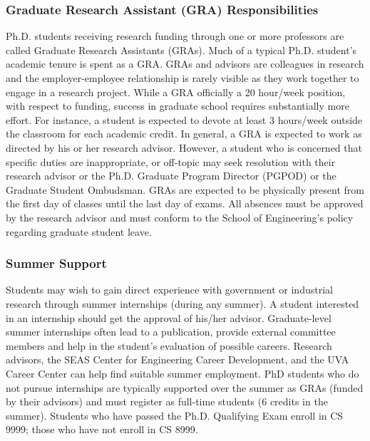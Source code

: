 \hypertarget{graduate-research-assistant-gra-responsibilities}{
\subsubsection{Graduate Research Assistant (GRA) Responsibilities}
\label{graduate-research-assistant-gra-responsibilities}
}

Ph.D. students receiving research funding through one or more professors
are called Graduate Research Assistants (GRAs). Much of a typical Ph.D.
student's academic tenure is spent as a GRA. GRAs and advisors are
colleagues in research and the employer-employee relationship is rarely
visible as they work together to engage in a research project. While a
GRA officially a 20 hour/week position, with respect to funding, success
in graduate school requires substantially more effort. For instance, a
student is expected to devote at least 3 hours/week outside the
classroom for each academic credit. In general, a GRA is expected to
work as directed by his or her research advisor. However, a student who
is concerned that specific duties are inappropriate, or off-topic may
seek resolution with their research advisor or the Ph.D. Graduate Program
Director (PGPOD) or the Graduate Student Ombudsman. GRAs are expected to be
physically present from the first day of classes until the last day of
exams. All absences must be approved by the research advisor and must
conform to the School of Engineering's policy regarding graduate student
leave.

\hypertarget{summer-support}{
\subsubsection{Summer Support}
\label{summer-support}
}

Students may wish to gain direct experience with government or
industrial research through summer internships (during any summer). A
student interested in an internship should get the approval of his/her
advisor. Graduate-level summer internships often lead to a publication,
provide external committee members and help in the student's evaluation
of possible careers. Research advisors, the SEAS Center for Engineering
Career Development, and the UVA Career Center can help find suitable
summer employment. PhD students who do not pursue internships are
typically supported over the summer as GRAs (funded by their advisors)
and must register as full-time students (6 credits in the summer). Students
who have passed the Ph.D. Qualifying Exam enroll in CS 9999; those who have not enroll in CS 8999.
